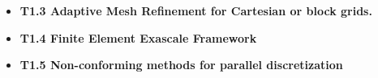\begin{itemize}
    \item {\bf T1.3 Adaptive Mesh Refinement for Cartesian or block grids.}
    \item {\bf T1.4 Finite Element Exascale Framework}
    \item {\bf T1.5 Non-conforming methods for parallel discretization}
    

\end{itemize}
